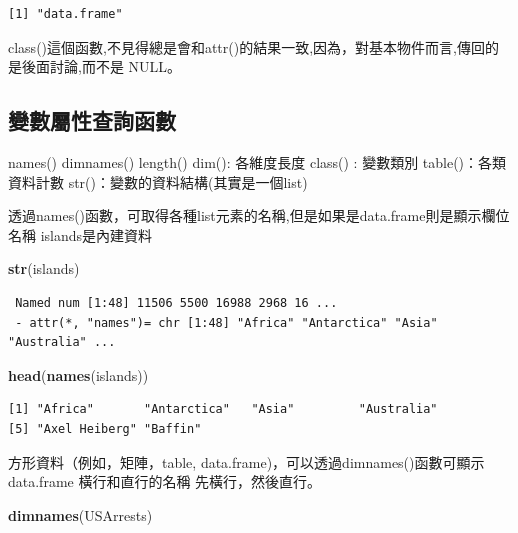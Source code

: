 \documentclass[]{book}
\newenvironment{Shaded}{\begin{snugshade}}{\end{snugshade}}
\newcommand{\KeywordTok}[1]{\textcolor[rgb]{0.13,0.29,0.53}{\textbf{#1}}}
\newcommand{\NormalTok}[1]{#1}
\theoremstyle{definition}
\theoremstyle{definition}
\theoremstyle{definition}
\theoremstyle{remark}
\begin{document}
\begin{verbatim}
[1] "data.frame"
\end{verbatim}

class()這個函數,不見得總是會和attr()的結果一致,因為，對基本物件而言,傳回的是後面討論,而不是
NULL。

\subsection{變數屬性查詢函數}

names() dimnames() length() dim(): 各維度長度 class() : 變數類別
table()：各類資料計數 str()：變數的資料結構(其實是一個list)

透過names()函數，可取得各種list元素的名稱,但是如果是data.frame則是顯示欄位名稱
islands是內建資料

\begin{Shaded}
\begin{Highlighting}[]
\KeywordTok{str}\NormalTok{(islands)}
\end{Highlighting}
\end{Shaded}

\begin{verbatim}
 Named num [1:48] 11506 5500 16988 2968 16 ...
 - attr(*, "names")= chr [1:48] "Africa" "Antarctica" "Asia" "Australia" ...
\end{verbatim}

\begin{Shaded}
\begin{Highlighting}[]
\KeywordTok{head}\NormalTok{(}\KeywordTok{names}\NormalTok{(islands)) }
\end{Highlighting}
\end{Shaded}

\begin{verbatim}
[1] "Africa"       "Antarctica"   "Asia"         "Australia"   
[5] "Axel Heiberg" "Baffin"      
\end{verbatim}

方形資料（例如，矩陣，table,
data.frame)，可以透過dimnames()函數可顯示data.frame 橫行和直行的名稱
先橫行，然後直行。

\begin{Shaded}
\begin{Highlighting}[]
\KeywordTok{dimnames}\NormalTok{(USArrests) }
\end{Highlighting}
\end{Shaded}
\end{document}
